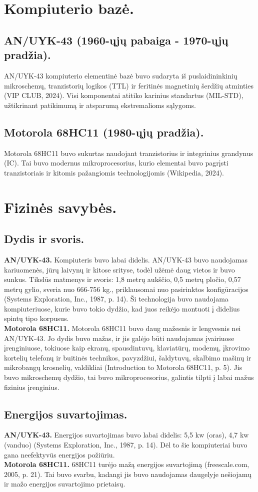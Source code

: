\documentclass[a4paper,12pt]{article}
\begin{document}
\section{Kompiuterio bazė.}
\subsection{AN/UYK-43 (1960-ųjų pabaiga - 1970-ųjų pradžia).}
AN/UYK-43 kompiuterio elementinė bazė buvo sudaryta iš puslaidininkinių mikroschemų, tranzistorių logikos (TTL) ir feritinės magnetinių šerdžių atminties (VIP CLUB, 2024). Visi komponentai atitiko karinius standartus (MIL-STD), užtikrinant patikimumą ir atsparumą ekstremalioms sąlygoms.
\subsection{Motorola 68HC11 (1980-ųjų pradžia).}
Motorola 68HC11 buvo sukurtas naudojant tranzistorius ir integrinius grandynus (IC). Tai buvo modernus mikroprocesorius, kurio elementai buvo pagrįsti tranzistoriais ir kitomis pažangiomis technologijomis (Wikipedia, 2024).

\section{Fizinės savybės.}
\subsection{Dydis ir svoris.}
\textbf{AN/UYK-43.} Kompiuteris buvo labai didelis. AN/UYK-43 buvo naudojamas kariuomenės, jūrų laivynų ir kitose srityse, todėl užėmė daug vietos ir buvo sunkus. Tikslūs matmenys ir svoris: 1,8 metrų aukščio, 0,5 metrų pločio, 0,57 metrų gylio, sveria nuo 666-756 kg., priklausomai nuo pasirinktos konfigūracijos (Systems Exploration, Inc., 1987, p. 14). Ši technologija buvo naudojama kompiuteriuose, kurie buvo tokio dydžio, kad juos reikėjo montuoti į didelius spintų tipo korpusus.\\
\textbf{Motorola 68HC11.} Motorola 68HC11 buvo daug mažesnis ir lengvesnis nei AN/UYK-43. Jo dydis buvo mažas, ir jis galėjo būti naudojamas įvairiuose įrenginiuose, tokiuose kaip ekranų, spausdintuvų, klaviatūrų, modemų, įkrovimo kortelių telefonų ir buitinės technikos, pavyzdžiui, šaldytuvų, skalbimo mašinų ir mikrobangų krosnelių, valdikliai (Introduction to Motorola 68HC11, p. 5). Jis buvo mikroschemų dydžio, tai buvo mikroprocesorius, galintis tilpti į labai mažus fizinius įrenginius.
\subsection{Energijos suvartojimas.} 
\textbf{AN/UYK-43.} Energijos suvartojimas buvo labai didelis: 5,5 kw (oras), 4,7 kw (vanduo) (Systems Exploration, Inc., 1987, p. 14). Dėl to šie kompiuteriai buvo gana neefektyvūs energijos požiūriu.\\
\textbf{Motorola 68HC11.} 68HC11 turėjo mažą energijos suvartojimą (freescale.com, 2005, p. 21). Tai buvo svarbu, kadangi jis buvo naudojamas daugelyje nešiojamų ir mažo energijos suvartojimo prietaisų.
\end{document}
